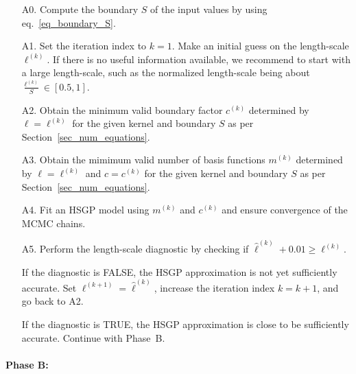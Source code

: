 \begin{enumerate}

\item[A0.] {\color{blue}Compute the boundary $S$ of the input values by using eq.~\eqref{eq_boundary_S}}.

\item[A1.] Set the iteration index to $k=1$. Make an initial guess on the length-scale $\ell^{(k)}$. If there is no useful information available, we recommend to start with a large length-scale, {\color{blue}such as the normalized length-scale being about $\frac{\ell^{(k)}}{S} \in [0.5, 1]$}. 

\item[A2.] Obtain the minimum valid boundary factor $c^{(k)}$ determined by $\ell=\ell^{(k)}$ for the given kernel and boundary $S$ as per Section~\ref{sec_num_equations}.

\item[A3.] Obtain the mimimum valid number of basis functions $m^{(k)}$ determined by $\ell=\ell^{(k)}$ and $c = c^{(k)}$ for the given kernel and boundary $S$ as per Section~\ref{sec_num_equations}. 

\item[A4.] Fit an HSGP model using $m^{(k)}$ and $c^{(k)}$ and ensure convergence of the MCMC chains.

\item[A5.] Perform the length-scale diagnostic by checking if $\hat{\ell}^{(k)} + 0.01 \geq \ell^{(k)}$. 

If the diagnostic is FALSE, the HSGP approximation is not yet sufficiently accurate. Set $\ell^{(k+1)} = \hat{\ell}^{(k)}$, increase the iteration index $k = k + 1$, and go back to A2.

If the diagnostic is TRUE, the HSGP approximation is close to be sufficiently accurate. Continue with Phase~B.

\end{enumerate}

\paragraph*{Phase B:}

